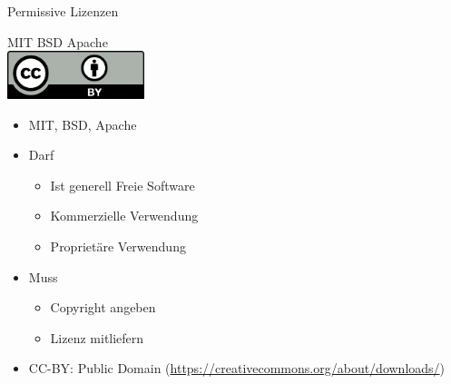 {\begin{frame}{Permissive Lizenzen}
	\begin{center}
		{\Huge MIT}
		\hfill
		{\Huge BSD}
		\hfill
		{\Huge Apache}
		\\
		\includegraphics[width=4cm]{res/cc-by.pdf}
	\end{center}
\end{frame}
\note
{
	\begin{itemize}
		\item MIT, BSD, Apache
		\item Darf
		\begin{itemize}
			\item Ist generell Freie Software
			\item Kommerzielle Verwendung
			\item Proprietäre Verwendung
		\end{itemize}
		\item Muss
		\begin{itemize}
			\item Copyright angeben
			\item Lizenz mitliefern
		\end{itemize}
		\item CC-BY: Public Domain (\url{https://creativecommons.org/about/downloads/})
	\end{itemize}
}

}
